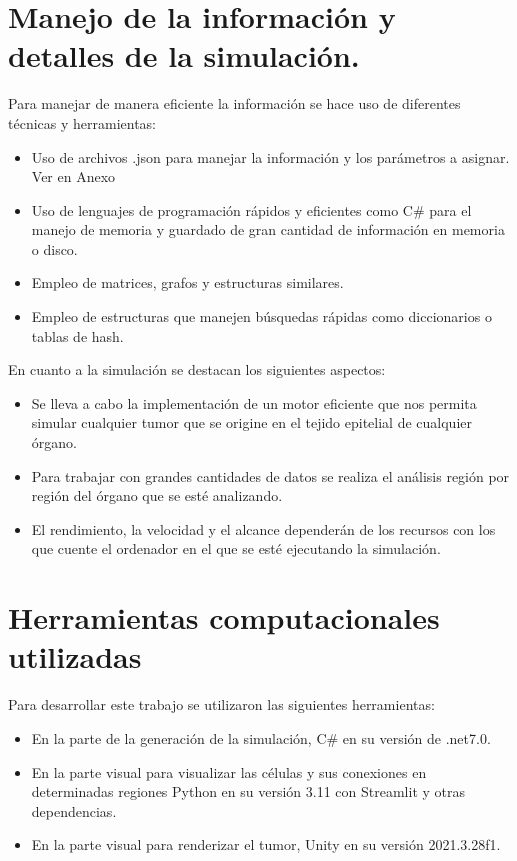 \section{Manejo de la informaci\'on y detalles de la simulaci\'on.}
Para manejar de manera eficiente la informaci\'on se hace uso de diferentes t\'ecnicas y herramientas:
\begin{itemize}
    \item Uso de archivos .json para manejar la información y los parámetros a asignar. Ver en Anexo %
    \item Uso de lenguajes de programación rápidos y eficientes como C\# para el manejo de memoria y guardado de gran cantidad de información en memoria o disco.
    \item Empleo de matrices, grafos y estructuras similares.
    \item Empleo de estructuras que manejen búsquedas rápidas como diccionarios o tablas de hash.
\end{itemize}

En cuanto a la simulaci\'on se destacan los siguientes aspectos:
\begin{itemize}
    \item Se lleva a cabo la implementación de un motor eficiente que nos permita simular cualquier tumor que se origine en el tejido epitelial de cualquier órgano.
    \item Para trabajar con grandes cantidades de datos se realiza el análisis región por región del órgano que se esté analizando.
    \item El rendimiento, la velocidad y el alcance dependerán de los recursos con los que cuente el ordenador en el que se esté ejecutando la simulación.
\end{itemize}

\section{Herramientas computacionales utilizadas}

Para desarrollar este trabajo se utilizaron las siguientes herramientas:
\begin{itemize}
    \item En la parte de la generaci\'on de la simulaci\'on, C\# en su versi\'on de .net7.0.
    \item En la parte visual para visualizar las c\'elulas y sus conexiones en determinadas regiones Python en su versi\'on 3.11 con Streamlit y otras dependencias.
    \item En la parte visual para renderizar el tumor, Unity en su versi\'on 2021.3.28f1.
\end{itemize}